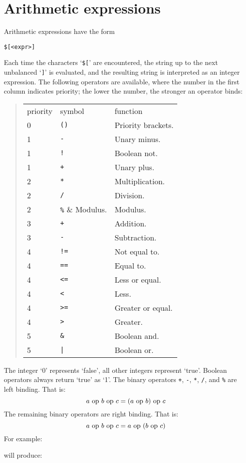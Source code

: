 \section{Arithmetic expressions}
\label{s.intexpr}
Arithmetic expressions have the form
\begin{showfile}
\begin{verbatim}
$[<expr>]
\end{verbatim}
\end{showfile}
Each time the characters `\texttt{\$[}' are encountered,
the string up to the next unbalanced `\texttt{]}' is evaluated,
and the resulting string is
interpreted as an integer expression.
The following operators are available, where the number in the first column
indicates priority; the lower the number, the stronger an operator binds:
\begin{quote}
\begin{tabular}{lll}
priority & symbol & function \\
0 & \verb'()' & Priority brackets. \\
1 & \verb'-' & Unary minus. \\
1 & \verb'!' & Boolean not. \\
1 & \verb'+' & Unary plus. \\
2 & \verb'*' & Multiplication. \\
2 & \verb'/' & Division. \\
2 & \verb'%' & Modulus. \\
3 & \verb'+' & Addition. \\
3 & \verb'-' & Subtraction.\\
4 & \verb'!=' & Not equal to. \\
4 & \verb'==' & Equal to. \\
4 & \verb'<=' & Less or equal. \\
4 & \verb'<' & Less. \\
4 & \verb'>=' & Greater or equal. \\
4 & \verb'>' & Greater. \\
5 & \verb'&' & Boolean and. \\
5 & \verb'|' & Boolean or. \\
\end{tabular}
\end{quote}
The integer `0' represents `false',
all other integers represent `true'.
Boolean operators always return `true' as `1'.
The binary operators \verb'+', \verb'-', \verb'*', \verb'/', and \verb'%' are
left binding. That is:
\[ a\ {\rm op}\ b\ {\rm op}\ c = (a\ {\rm op}\ b)\ {\rm op}\ c \]
The remaining binary operators are right binding.
That is:
\[ a\ {\rm op}\ b\ {\rm op}\ c = a\ {\rm op}\ (b\ {\rm op}\ c) \]
For example:
\begin{showfile}

\end{showfile}
will produce:
\begin{showfile}

\end{showfile}
